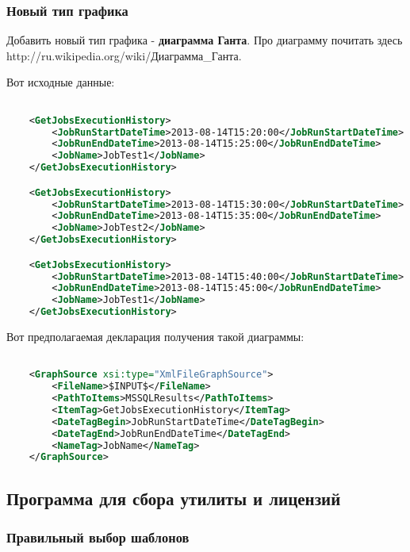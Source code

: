\subsubsection{Новый тип графика}

Добавить новый тип графика - \textbf{диаграмма Ганта}. Про диаграмму почитать здесь
http://ru.wikipedia.org\-/wiki/\-Диаграмма\_Ганта.

Вот исходные данные:

\begin{lstlisting}[language=XML,label=GanttChartData,caption=Данные для диаграммы Ганта]

	<GetJobsExecutionHistory>
		<JobRunStartDateTime>2013-08-14T15:20:00</JobRunStartDateTime>
		<JobRunEndDateTime>2013-08-14T15:25:00</JobRunEndDateTime>
		<JobName>JobTest1</JobName>
	</GetJobsExecutionHistory>

	<GetJobsExecutionHistory>
		<JobRunStartDateTime>2013-08-14T15:30:00</JobRunStartDateTime>
		<JobRunEndDateTime>2013-08-14T15:35:00</JobRunEndDateTime>
		<JobName>JobTest2</JobName>
	</GetJobsExecutionHistory>

	<GetJobsExecutionHistory>
		<JobRunStartDateTime>2013-08-14T15:40:00</JobRunStartDateTime>
		<JobRunEndDateTime>2013-08-14T15:45:00</JobRunEndDateTime>
		<JobName>JobTest1</JobName>
	</GetJobsExecutionHistory>

\end{lstlisting}

Вот предполагаемая декларация получения такой диаграммы:

\begin{lstlisting}[language=XML,label=GanttChartDefinition,caption=Определение для диаграммы Ганта]

	<GraphSource xsi:type="XmlFileGraphSource">
		<FileName>$INPUT$</FileName>
		<PathToItems>MSSQLResults</PathToItems>
		<ItemTag>GetJobsExecutionHistory</ItemTag>
		<DateTagBegin>JobRunStartDateTime</DateTagBegin>
		<DateTagEnd>JobRunEndDateTime</DateTagEnd>
		<NameTag>JobName</NameTag>
	</GraphSource>

\end{lstlisting}

\subsection{Программа для сбора утилиты и лицензий}

\subsubsection{Правильный выбор шаблонов}

